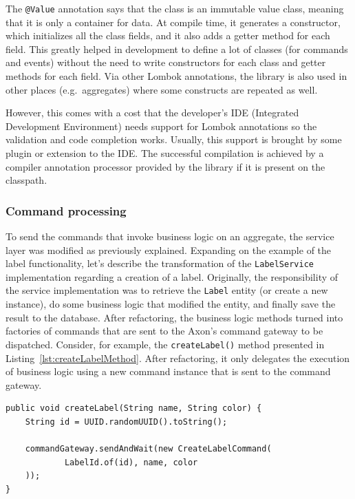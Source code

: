 \documentclass{book}
\begin{document}
The \texttt{@Value} annotation says that the class is an immutable value
class, meaning that it is only a container for data. At compile time, it
generates a constructor, which initializes all the class fields, and it
also adds a getter method for each field. This greatly helped in
development to define a lot of classes (for commands and events) without
the need to write constructors for each class and getter methods for
each field. Via other Lombok annotations, the library is also used in
other places (e.g.~aggregates) where some constructs are repeated as
well.

However, this comes with a cost that the developer's IDE (Integrated
Development Environment) needs support for Lombok annotations so the
validation and code completion works. Usually, this support is brought
by some plugin or extension to the IDE. The successful compilation is
achieved by a compiler annotation processor provided by the library if
it is present on the classpath.


\subsubsection{Command processing}\label{command-processing}

To send the commands that invoke business logic on an aggregate, the
service layer was modified as previously explained. Expanding on the
example of the label functionality, let's describe the transformation of
the \texttt{LabelService} implementation regarding a creation of a
label. Originally, the responsibility of the service implementation was
to retrieve the \texttt{Label} entity (or create a new instance), do
some business logic that modified the entity, and finally save the
result to the database. After refactoring, the business logic methods
turned into factories of commands that are sent to the Axon's command
gateway to be dispatched. Consider, for example, the
\texttt{createLabel()} method presented in Listing~\ref{lst:createLabelMethod}.
After refactoring, it only delegates the execution of business
logic using a new command instance that is sent to the command gateway.

\begin{lstlisting}[caption={The \texttt{createLabel()} service method after refactoring},label={lst:createLabelMethod},captionpos=b,float,floatplacement=H]
public void createLabel(String name, String color) {
    String id = UUID.randomUUID().toString();

    commandGateway.sendAndWait(new CreateLabelCommand(
            LabelId.of(id), name, color
    ));
}
\end{lstlisting}
\end{document}

